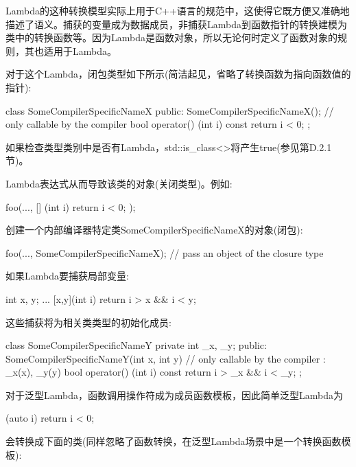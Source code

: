 \begin{notice}
Lambda的这种转换模型实际上用于C++语言的规范中，这使得它既方便又准确地描述了语义。捕获的变量成为数据成员，非捕获Lambda到函数指针的转换建模为类中的转换函数等。因为Lambda是函数对象，所以无论何时定义了函数对象的规则，其也适用于Lambda。
\end{notice}

对于这个Lambda，闭包类型如下所示(简洁起见，省略了转换函数为指向函数值的指针):

\begin{cpp}
class SomeCompilerSpecificNameX
{
	public:
	SomeCompilerSpecificNameX(); // only callable by the compiler
	bool operator() (int i) const
	{
		return i < 0;
	}
};
\end{cpp}

如果检查类型类别中是否有Lambda，std::is\_class<>将产生true(参见第D.2.1节)。

Lambda表达式从而导致该类的对象(关闭类型)。例如:

\begin{cpp}
foo(...,
	[] (int i) {
		return i < 0;
	});
\end{cpp}

创建一个内部编译器特定类SomeCompilerSpecificNameX的对象(闭包):

\begin{cpp}
foo(...,
	SomeCompilerSpecificNameX{}); // pass an object of the closure type
\end{cpp}

如果Lambda要捕获局部变量:

\begin{cpp}
int x, y;
...
[x,y](int i) {
	return i > x && i < y;
}
\end{cpp}

这些捕获将为相关类类型的初始化成员:

\begin{cpp}
class SomeCompilerSpecificNameY {
private
	int _x, _y;
public:
	SomeCompilerSpecificNameY(int x, int y) // only callable by the compiler
	: _x(x), _y(y) {
	}
	bool operator() (int i) const {
		return i > _x && i < _y;
	}
};
\end{cpp}

对于泛型Lambda，函数调用操作符成为成员函数模板，因此简单泛型Lambda为

\begin{cpp}
[] (auto i) {
	return i < 0;
}
\end{cpp}

会转换成下面的类(同样忽略了函数转换，在泛型Lambda场景中是一个转换函数模板):

